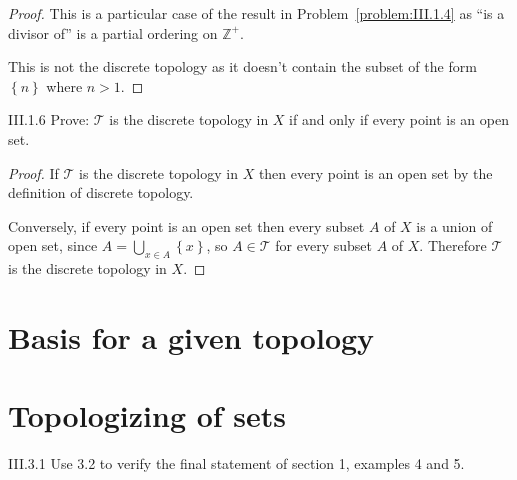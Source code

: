 \begin{proof}
    This is a particular case of the result in Problem~\ref{problem:III.1.4} as ``is a divisor of'' is a partial ordering on \( \mathbb{Z}^{+} \).

    This is not the discrete topology as it doesn't contain the subset of the form \( \left\{ n \right\} \) where \( n > 1 \).
\end{proof}

\begin{problem}{III.1.6}
Prove: \( \mathscr{T} \) is the discrete topology in \( X \) if and only if every point is an open set.
\end{problem}

\begin{proof}
    If \( \mathscr{T} \) is the discrete topology in \( X \) then every point is an open set by the definition of discrete topology.

    Conversely, if every point is an open set then every subset \( A \) of \( X \) is a union of open set, since \( A = \bigcup_{x\in A} \left\{x\right\} \), so \( A \in \mathscr{T} \) for every subset \( A \) of \( X \). Therefore \( \mathscr{T} \) is the discrete topology in \( X \).
\end{proof}

\section{Basis for a given topology}

\section{Topologizing of sets}

\begin{problem}{III.3.1}
Use 3.2 to verify the final statement of section 1, examples 4 and 5.
\end{problem}

